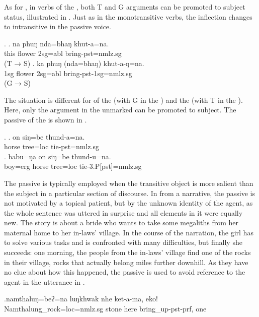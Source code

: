 As for , in verbs of the , both T and G arguments can be promoted to subject  status, illustrated in \Next. Just as in the monotransitive verbs, the inflection changes to intransitive in the passive voice. 

\ex. \ag. na phuŋ nda=bhaŋ khut-a=na.\\
this  flower {\sc 2sg=abl} bring{\sc [3sg]-pst=nmlz.sg}\\
 (T → S)
\bg. ka phuŋ (nda=bhaŋ) khut-a-ŋ=na.\\ 
{\sc 1sg} flower {\sc 2sg=abl} bring{\sc -pst-1sg=nmlz.sg}\\
 (G → S)
 

The situation is different for  of the  (with G in the ) and the  (with T in the ). Here, only the argument in the  unmarked  can be promoted to subject. The passive of the  is shown in \Next.

\ex. \ag. on siŋ=be thund-a=na.\\
horse  tree{\sc =loc} tie{\sc [3sg]-pst=nmlz.sg}\\
\bg. babu=ŋa on siŋ=be thund-u=na.\\
boy{\sc =erg} horse  tree{\sc =loc}  tie{\sc -3.P[pst]=nmlz.sg}\\


The passive is typically employed when the transitive object is more salient than the subject in a particular section of discourse. In \Next from a narrative, the passive is not motivated by a topical patient, but by the unknown identity of the agent, as the whole sentence was uttered in surprise and all elements in it were equally new. The story is about a bride who wants to take some megaliths from her maternal home to her in-laws' village. In the course of the narration, the girl has to solve various tasks and is confronted with many difficulties, but finally she succeeds: one morning, the people from the in-laws' village find one of the rocks in their village, rocks that actually belong miles further downhill. As they have no clue about how this happened, the passive is used to avoid reference to the agent in the utterance in \Next. 

\exg.namthaluŋ=beʔ=na  luŋkhwak nhe  ket-a-ma, eko!\\
Namthalung\_rock{\sc =loc=nmlz.sg} stone here bring\_up{\sc [3sg]-pst-prf}, one\\


